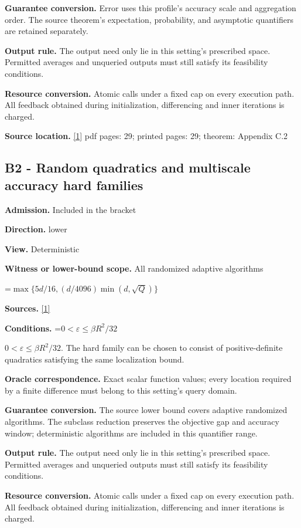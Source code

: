 \documentclass[10pt,a4paper]{article}
\newcommand{\AtlasMath}[1]{\par\begingroup\centering\setbox0=\hbox{$\displaystyle #1$}\ifdim\wd0>1.4\linewidth\typeout{ATLAS WIDE FORMULA: \the\wd0}\fi\ifdim\wd0>\linewidth\resizebox{\linewidth}{!}{\box0}\else\box0\fi\par\endgroup}
\newcommand{\AtlasInlineMath}[1]{\begingroup\setbox0=\hbox{$#1$}\ifdim\wd0>.4\linewidth\endgroup\AtlasMath{#1}\else\endgroup$#1$\fi}
\begin{document}
\textbf{Guarantee conversion.} Error uses this profile's accuracy scale and aggregation order. The source theorem's expectation, probability, and asymptotic quantifiers are retained separately.

\textbf{Output rule.} The output need only lie in this setting's prescribed space. Permitted averages and unqueried outputs must still satisfy its feasibility conditions.

\textbf{Resource conversion.} Atomic calls under a fixed cap on every execution path. All feedback obtained during initialization, differencing and inner iterations is charged.

\textbf{Source location.} \href{https://arxiv.org/html/2610.00345v1}{[1]} pdf pages: 29; printed pages: 29; theorem: Appendix C.2

\subsection{B2 - Random quadratics and multiscale accuracy hard families}
\textbf{Admission.} Included in the bracket

\textbf{Direction.} lower

\textbf{View.} Deterministic

\textbf{Witness or lower-bound scope.} All randomized adaptive algorithms

\AtlasMath{\max\{5d/16,(d/4096)\min(d,\sqrt Q)\}}
\textbf{Sources.} \href{https://arxiv.org/html/2610.00345v1}{[1]}

\textbf{Conditions.} \AtlasInlineMath{0<\varepsilon\le\beta R^2/32}. The hard family can be chosen to consist of positive-definite quadratics satisfying the same localization bound.

\textbf{Oracle correspondence.} Exact scalar function values; every location required by a finite difference must belong to this setting's query domain.

\textbf{Guarantee conversion.} The source lower bound covers adaptive randomized algorithms. The subclass reduction preserves the objective gap and accuracy window; deterministic algorithms are included in this quantifier range.

\textbf{Output rule.} The output need only lie in this setting's prescribed space. Permitted averages and unqueried outputs must still satisfy its feasibility conditions.

\textbf{Resource conversion.} Atomic calls under a fixed cap on every execution path. All feedback obtained during initialization, differencing and inner iterations is charged.
\end{document}
